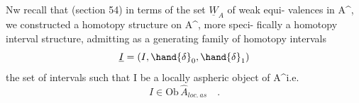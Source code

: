 Nw recall that (section 54) in terms of the set $\underline{W}_A$ of weak equi-%
valences in A\^{}, we constructed a homotopy structure on A\^{}, more speci-%
fically a homotopy interval structure, admitting as a generating family
of homotopy intervals 
\[ \underline{I} =(I,\hand{\delta}_0,\hand{\delta}_1) \]
the set of intervals such that I be a locally aspheric object of A\^{}\hand{\unsure{,}}i.e.
\[ I \in \mathrm{Ob}\, \hat{A}_{loc.\ as} \quad . \]

